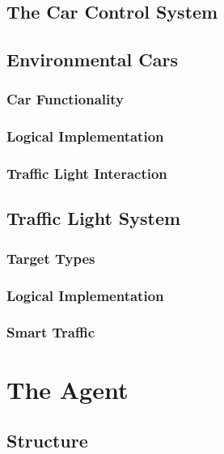 \documentclass{article}
\begin{document}
\subsection{The Car Control System}
\lipsum[2][1]

\subsection{Environmental Cars}
\lipsum[2][1]

\subsubsection{Car Functionality}
\lipsum[2][1]

\subsubsection{Logical Implementation}
\lipsum[2][1]

\subsubsection{Traffic Light Interaction}
\lipsum[2][1]

\subsection{Traffic Light System}
\lipsum[2][1]

\subsubsection{Target Types}
\lipsum[2][1]

\subsubsection{Logical Implementation}
\lipsum[2][1]

\subsubsection{Smart Traffic}
\lipsum[2][1]

\section{The Agent}
\lipsum[2][1]

\subsection{Structure}
\lipsum[2][1]
\end{document}
